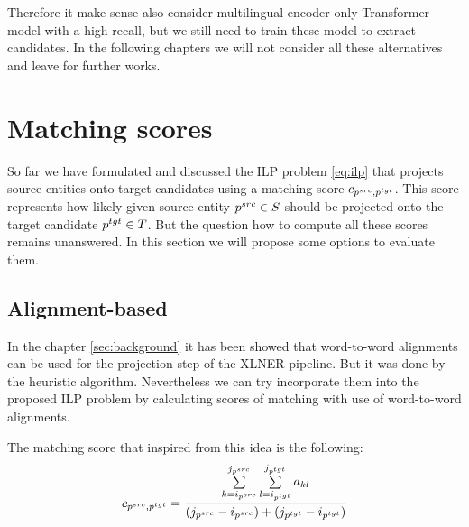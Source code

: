 Therefore it make sense also consider multilingual encoder-only Transformer model with a high recall,
but we still need to train these model to extract candidates. In the following chapters we will not consider all
these alternatives and leave for further works.

\section{Matching scores}
So far we have formulated and discussed the ILP problem \eqref{eq:ilp} that projects source entities onto
target candidates using a matching score \( c_{p^{src}, p^{tgt}} \). This score represents
how likely given source entity \( p^{src} \in S \) should be projected onto the target candidate \( p^{tgt} \in T \).
But the question how to compute all these scores remains unanswered. In this section we will propose
some options to evaluate them.

\subsection{Alignment-based}
In the chapter \ref{sec:background} it has been showed that word-to-word alignments can be used
for the projection step of the XLNER pipeline. But it was done by the heuristic algorithm.
Nevertheless we can try incorporate them into the proposed ILP problem by calculating scores of matching with use of
word-to-word alignments.

The matching score that inspired from this idea is the following:
\begin{equation} \label{eq:align_cost}
    c_{p^{src}, p^{tgt}} =
    \frac{\sum\limits_{k=i_{p^{src}}}^{j_{p^{src}}} \sum\limits_{l=i_{p^{tgt}}}^{j_{p^{tgt}}} a_{kl}}
    {(j_{p^{src}} - i_{p^{src}}) + (j_{p^{tgt}} - i_{p^{tgt}})}
\end{equation}

